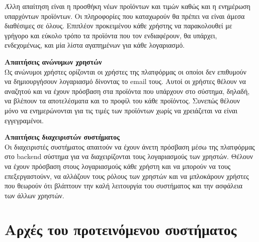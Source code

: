 \documentclass[12pt, oneside, a4paper]{report}
\begin{document}
\hspace{0.6cm}Άλλη απαίτηση είναι η προσθήκη νέων προϊόντων και τιμών καθώς και η ενημέρωση υπαρχόντων προϊόντων. Οι πληροφορίες που καταχωρούν θα πρέπει να είναι άμεσα διαθέσιμες σε όλους. Επιπλέον προκειμένου κάθε χρήστης να παρακολουθεί με γρήγορο και εύκολο τρόπο τα προϊόντα που τον ενδιαφέρουν, θα υπάρχει, ενδεχομένως, και μία λίστα αγαπημένων για κάθε λογαριασμό.\\
\vspace{0.5cm}

\textbf{Απαιτήσεις ανώνυμων χρηστών}\\
\vspace{0.5cm}
\hspace{0.6cm}Ως ανώνυμοι χρήστες ορίζονται οι χρήστες της πλατφόρμας οι οποίοι δεν επιθυμούν να δημιουργήσουν λογαριασμό δίνοντας το email τους. Αυτοί οι χρήστες θέλουν να αναζητού και να  έχουν πρόσβαση στα προϊόντα που υπάρχουν στο σύστημα, δηλαδή, να βλέπουν τα αποτελέσματα και το προφίλ του κάθε προϊόντος. Συνεπώς θέλουν μόνο να ενημερώνονται για τις τιμές των προϊόντων χωρίς να χρειάζεται να είναι εγγεγραμένοι.\\
\vspace{0.5cm}

\textbf{Απαιτήσεις διαχειριστών συστήματος}\\
\vspace{0.5cm}
\hspace{0.6cm}Οι διαχειριστές συστήματος απαιτούν να έχουν άνετη πρόσβαση μέσω της πλατφόρμας στο backend σύστημα για να διαχειρίζονται τους λογαριασμούς των χρηστών. Θέλουν να έχουν πρόσβαση στους λογαριασμούς κάθε χρήστη και να μπορούν να τους επεξεργαστούνν, να αλλάζουν τους ρόλους των χρηστών και να μπλοκάρουν χρήστες που θεωρούν ότι βλάπτουν την καλή λειτουργία του συστήματος και την ασφάλεια των άλλων χρηστών. 

\section{Αρχές του προτεινόμενου συστήματος}
\end{document}

